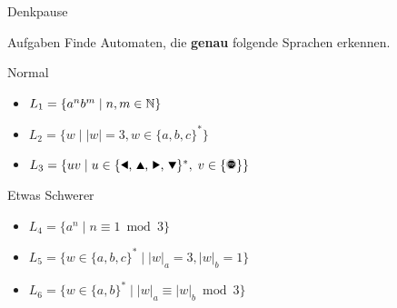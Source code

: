 {
\begin{frame}{Denkpause}
    \begin{alertblock}{Aufgaben}
    Finde Automaten, die \textbf{genau} folgende Sprachen erkennen.
    \end{alertblock}
    \begin{block}{Normal}
    \begin{itemize}
        \item $L_1 = \{a^nb^m \mid n, m\in\mathbb{N}\}$
        \item $L_2 = \{w \mid |w| = 3, w\in \{a,b,c\}^*\}$
        \item $L_3 = \{uv \mid u\in\{\text{\Rewind, \MoveUp, \Forward, \MoveDown}\}^\ast,\;v\in\{\text{\Stopsign}\}\}$
    \end{itemize}
    \end{block}
    \begin{block}{Etwas Schwerer}
    \begin{itemize}
        \item $L_4 = \{a^n \mid n \equiv 1 \bmod 3\}$
        \item $L_5 = \{w \in \{a,b,c\}^* \mid |w|_a = 3, |w|_b = 1\}$
        \item $L_6=\{w \in \{a,b\}^* \mid |w|_a \equiv |w|_b \bmod 3\}$
    \end{itemize}
    \end{block}
\end{frame}
}



